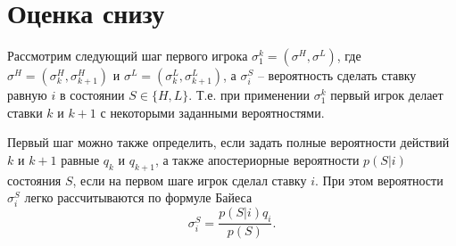 \section{Оценка снизу}
\label{sec:lower_bound}

Рассмотрим следующий шаг первого игрока $ \sigma^k_1 = (\sigma^H, \sigma^L) $, где $ \sigma^H = (\sigma^H_k, \sigma^H_{k+1}) $ и $ \sigma^L = (\sigma^L_k, \sigma^L_{k+1}) $, а $ \sigma^S_i $ -- вероятность сделать ставку равную $ i $ в состоянии $ S \in \{ H, L \} $. 
Т.е. при применении $ \sigma^k_1 $ первый игрок делает ставки $ k $ и $ k + 1 $ с некоторыми заданными вероятностями. 

Первый шаг можно также определить, если задать полные вероятности действий $ k $ и $ k + 1 $ равные $ q_k $ и $ q_{k+1} $, а также апостериорные вероятности $ p(S|i) $ состояния $ S $, если на первом шаге игрок сделал ставку $ i $. При этом вероятности $ \sigma^S_i $ легко рассчитываются по формуле Байеса
\[
    \sigma^S_i = \frac{p(S|i)q_i}{p(S)}.
\]

